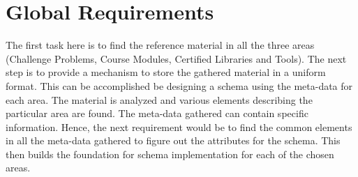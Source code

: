 \documentclass[11pt,letterpaper]{report}
\begin{document}
\chapter{Global Requirements}
The first task here is to find the reference material in all the three areas (Challenge Problems, Course Modules, Certified Libraries and Tools). The next step is to provide a mechanism to store the gathered material in a uniform format. This can be accomplished be designing a schema using the meta-data for each area. The material is analyzed and various elements describing the particular area are found. The meta-data gathered can contain specific information. Hence, the next requirement would be to find the common elements in all the meta-data gathered to figure out the attributes for the schema. This then builds the foundation for schema implementation for each of the chosen areas.\newline
\end{document}
